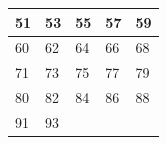 \documentclass{article}
\begin{document}
\begin{multicols}{2}
\begin{center}
\begin{tabularx}{0.47\textwidth} { 
  | >{\centering\arraybackslash}X
  | >{\centering\arraybackslash}X
  | >{\centering\arraybackslash}X 
  | >{\centering\arraybackslash}X 
  | >{\centering\arraybackslash}X  | }
 \hline
   \vspace*{-2.2mm}51\vspace*{0.5mm} & \vspace*{-2.2mm}53\vspace*{0.5mm}
 & \vspace*{-2.2mm}55\vspace*{0.5mm} & \vspace*{-2.2mm}57\vspace*{0.5mm}
 & \vspace*{-2.2mm}59\vspace*{0.5mm} \\
 \hline
   \vspace*{-2.2mm}60\vspace*{0.5mm} & \vspace*{-2.2mm}62\vspace*{0.5mm}
 & \vspace*{-2.2mm}64\vspace*{0.5mm} & \vspace*{-2.2mm}66\vspace*{0.5mm}
 & \vspace*{-2.2mm}68\vspace*{0.5mm} \\
 \hline
   \vspace*{-2.2mm}71\vspace*{0.5mm} & \vspace*{-2.2mm}73\vspace*{0.5mm}
 & \vspace*{-2.2mm}75\vspace*{0.5mm} & \vspace*{-2.2mm}77\vspace*{0.5mm}
 & \vspace*{-2.2mm}79\vspace*{0.5mm} \\
 \hline
   \vspace*{-2.2mm}80\vspace*{0.5mm} & \vspace*{-2.2mm}82\vspace*{0.5mm}
 & \vspace*{-2.2mm}84\vspace*{0.5mm} & \vspace*{-2.2mm}86\vspace*{0.5mm}
 & \vspace*{-2.2mm}88\vspace*{0.5mm} \\
 \hline
   \vspace*{-2.2mm}91\vspace*{0.5mm} & \vspace*{-2.2mm}93\vspace*{0.5mm}

\end{tabularx}
\end{center}
\end{multicols}
\end{document}
